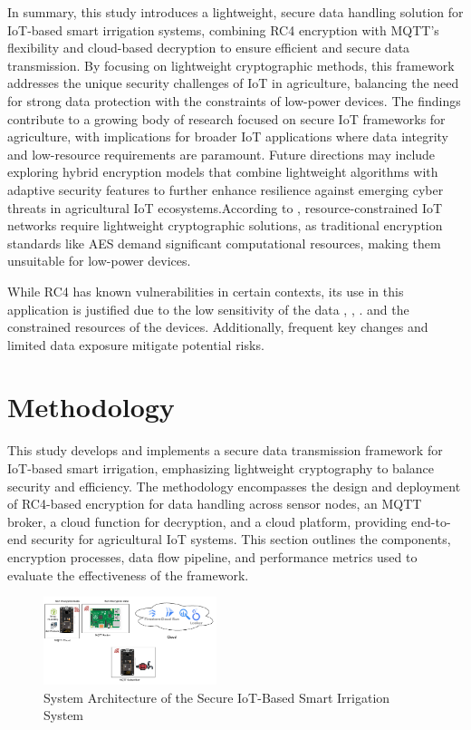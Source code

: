 \documentclass[conference]{IEEEtran}
\begin{document}
In summary, this study introduces a lightweight, secure data handling solution for IoT-based smart irrigation systems, combining RC4 encryption with MQTT's flexibility and cloud-based decryption to ensure efficient and secure data transmission. By focusing on lightweight cryptographic methods, this framework addresses the unique security challenges of IoT in agriculture, balancing the need for strong data protection with the constraints of low-power devices. The findings contribute to a growing body of research focused on secure IoT frameworks for agriculture, with implications for broader IoT applications where data integrity and low-resource requirements are paramount. Future directions may include exploring hybrid encryption models that combine lightweight algorithms with adaptive security features to further enhance resilience against emerging cyber threats in agricultural IoT ecosystems.According to \cite{ref4}, resource-constrained IoT networks require lightweight cryptographic solutions, as traditional encryption standards like AES demand significant computational resources, making them unsuitable for low-power devices.

While RC4 has known vulnerabilities in certain contexts, its use in this application is justified due to the low sensitivity of the data \cite{ref4}, \cite{ref9}, \cite{ref10}. and the constrained resources of the devices. Additionally, frequent key changes and limited data exposure mitigate potential risks.

\section{Methodology}

This study develops and implements a secure data transmission framework for IoT-based smart irrigation, emphasizing lightweight cryptography to balance security and efficiency. The methodology encompasses the design and deployment of RC4-based encryption for data handling across sensor nodes, an MQTT broker, a cloud function for decryption, and a cloud platform, providing end-to-end security for agricultural IoT systems. This section outlines the components, encryption processes, data flow pipeline, and performance metrics used to evaluate the effectiveness of the framework.

\begin{figure}[ht]
\centering
\includegraphics[width=0.45\textwidth]{system_architecture.png}
\caption{System Architecture of the Secure IoT-Based Smart Irrigation System}
\label{fig:system_architecture}
\end{figure}
\end{document}
